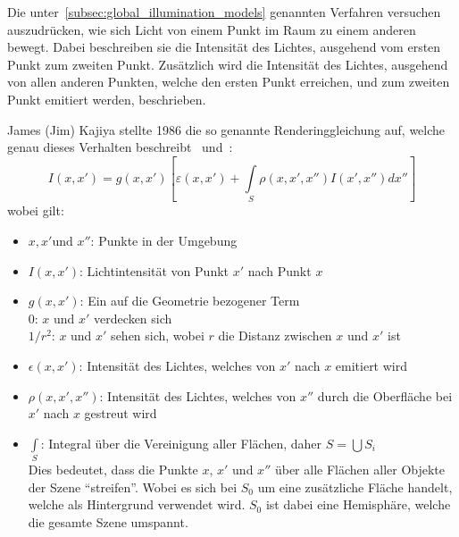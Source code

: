 Die unter~\ref{subsec:global_illumination_models} genannten Verfahren versuchen
auszudrücken, wie sich Licht von einem Punkt im Raum zu einem anderen bewegt.
Dabei beschreiben sie die Intensität des Lichtes, ausgehend vom ersten Punkt
zum zweiten Punkt. Zusätzlich wird die Intensität des Lichtes, ausgehend von
allen anderen Punkten, welche den ersten Punkt erreichen, und zum zweiten Punkt
emitiert werden, beschrieben.

James (Jim) Kajiya stellte 1986 die so genannte Renderinggleichung auf, welche
genau dieses Verhalten beschreibt~\cite{kajiya_rendering_1986}
und~\cite{foley_computer_1996}:
\begin{equation}
    I(x, x') = g(x, x')[\varepsilon(x, x') + \int\limits_{S}\rho(x, x', x'')I(x', x'')dx'']
\end{equation}
wobei gilt:

\begin{itemize}
    \item $x, x' \text{und } x''$: Punkte in der Umgebung
    \item $ I(x, x')$:            Lichtintensität von Punkt $x'$ nach Punkt $x$
    \item $ g(x, x')$:            Ein auf die Geometrie bezogener Term\\
                                  \hspace*{4mm} $0$:     \hspace*{6mm} $x$ und $x'$ verdecken sich\\
                                  \hspace*{4mm} $1/r^2$: \hspace*{1mm} $x$ und $x'$ sehen sich, wobei $r$ die Distanz zwischen $x$ und $x'$ ist
    \item $\epsilon(x, x')$:      Intensität des Lichtes, welches von $x'$ nach $x$ emitiert wird
    \item $\rho(x, x', x'')$:     Intensität des Lichtes, welches von $x''$
                                  durch die Oberfläche bei $x'$ nach $x$
                                  gestreut wird
    \item $\int\limits_{S}$:      Integral über die Vereinigung aller Flächen,
                                  daher $ S = \bigcup{S_{i}} $\\
                                      Dies bedeutet, dass die Punkte $x$, $x'$
                                      und $x''$ über alle Flächen aller Objekte
                                      der Szene ``streifen''.  Wobei es sich
                                      bei $S_{0}$ um eine zusätzliche Fläche
                                      handelt, welche als Hintergrund verwendet
                                      wird.  $S_{0}$ ist dabei eine Hemisphäre,
                                      welche die gesamte Szene umspannt.
\end{itemize}

